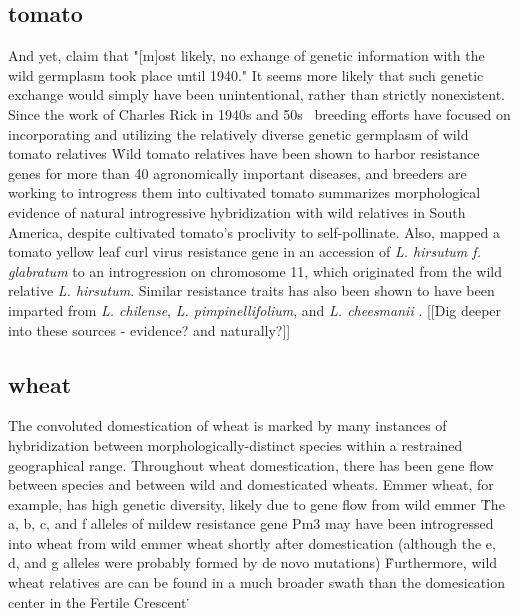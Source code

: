 \documentclass[11pt]{article}
\begin{document}
\subsection*{tomato}

And yet, \cite{bai2007domestication} claim that "[m]ost likely, no exhange of genetic information with the wild germplasm took place until 1940."
It seems more likely that such genetic exchange would simply have been unintentional, rather than strictly nonexistent.
Since the work of Charles Rick in 1940s and 50s \cite{rick1953novel}\, breeding efforts have focused on incorporating and utilizing the relatively diverse genetic germplasm of wild tomato relatives \cite{rick1988tomato, miller1990rflp, rick1982potential}\.
Wild tomato relatives have been shown to harbor resistance genes for more than 40 agronomically important diseases, and breeders are working to introgress them into cultivated tomato \cite{rick1995utilization}\.
\cite{rick1958role} summarizes morphological evidence of natural introgressive hybridization with wild relatives in South America, despite cultivated tomato's proclivity to self-pollinate.
Also, \cite{hanson2000mapping} mapped a tomato yellow leaf curl virus resistance gene in an accession of \emph{L. hirsutum f. glabratum} \cite{banerjee1990transfer} to an introgression on chromosome 11, which originated from the wild relative \emph{L. hirsutum}.
Similar resistance traits has also been shown to have been imparted from \emph{L. chilense}, \emph{L. pimpinellifolium}, and \emph{L. cheesmanii} \cite{hanson2000mapping}.
[[Dig deeper into these sources - evidence?  and naturally?]]





\subsection*{wheat}

The convoluted domestication of wheat is marked by many instances of hybridization between morphologically-distinct species within a restrained geographical range.
Throughout wheat domestication, there has been gene flow between species and between wild and domesticated wheats.
Emmer wheat, for example, has high genetic diversity, likely due to gene flow from wild emmer \cite{luo2007structure, dvorak2006molecular}\.
The a, b, c, and f alleles of mildew resistance gene Pm3 may have been introgressed into wheat from wild emmer wheat shortly after domestication (although the e, d, and g alleles were probably formed by de novo mutations) \cite{TPJ:TPJ2772}\.
Furthermore, wild wheat relatives are can be found in a much broader swath than the domesication center in the Fertile Crescent \cite{CWR}\.
\end{document}
